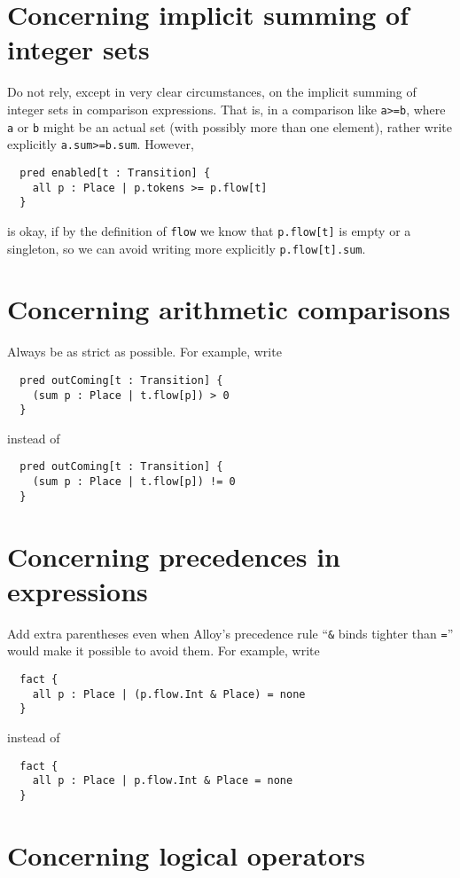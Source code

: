 \documentclass{article}
\begin{document}
\section*{Concerning implicit summing of integer sets}

Do not rely, except in very clear circumstances, on the implicit summing of integer sets in comparison expressions.
That is, in a comparison like \lstinline|a>=b|, where \lstinline|a| or \lstinline|b| might be an actual set (with possibly more than one element), rather write explicitly \lstinline|a.sum>=b.sum|.
However,
\begin{lstlisting}
  pred enabled[t : Transition] {
    all p : Place | p.tokens >= p.flow[t]
  }
\end{lstlisting}
is okay, if by the definition of \lstinline|flow| we know that \lstinline|p.flow[t]| is empty or a singleton, so we can avoid writing more explicitly \lstinline|p.flow[t].sum|.

\section*{Concerning arithmetic comparisons}

Always be as strict as possible.
For example, write
\begin{lstlisting}
  pred outComing[t : Transition] {
    (sum p : Place | t.flow[p]) > 0
  }
\end{lstlisting}
instead of
\begin{lstlisting}
  pred outComing[t : Transition] {
    (sum p : Place | t.flow[p]) != 0
  }
\end{lstlisting}

\section*{Concerning precedences in expressions}

Add extra parentheses even when Alloy's precedence rule ``\lstinline|&| binds tighter than \lstinline|=|'' would make it possible to avoid them.
For example, write
\begin{lstlisting}
  fact {
    all p : Place | (p.flow.Int & Place) = none
  }
\end{lstlisting}
instead of
\begin{lstlisting}
  fact {
    all p : Place | p.flow.Int & Place = none
  }
\end{lstlisting}

\section*{Concerning logical operators}
\end{document}
